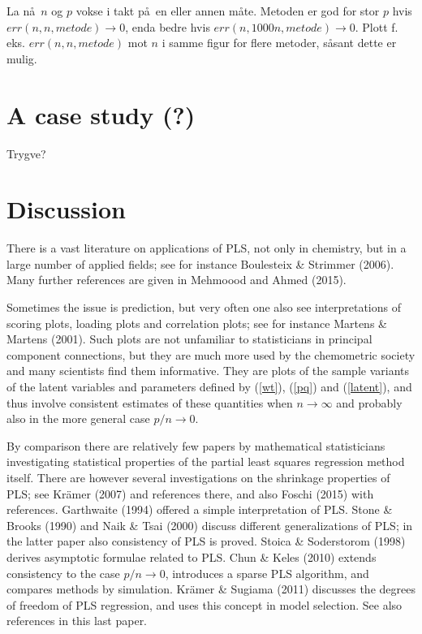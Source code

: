 \documentclass[11pt]{article}
\begin{document}
La n\aa\ $n$ og $p$ vokse i takt p\aa\ en eller annen m\aa te. Metoden er god for stor $p$ hvis $err(n,n,metode)\rightarrow 0$, enda bedre hvis $err(n, 1000n, metode)\rightarrow 0$. Plott f. eks.  $err(n,n, metode)$ mot $n$ i samme figur for flere metoder, s\aa sant dette er mulig.

\section{A case study (?)}

Trygve?

\section{Discussion}

There is a vast literature on applications of PLS, not only in chemistry, but in a large number of applied fields; see for instance Boulesteix \& Strimmer (2006). Many further references are given in Mehmoood and Ahmed (2015).

Sometimes the issue is prediction, but very often one also see interpretations of scoring plots, loading plots and correlation plots; see for instance Martens \& Martens (2001). Such plots are not unfamiliar to statisticians in principal component connections, but they are much more used by the chemometric society and many scientists find them informative. They are plots of the sample variants of the latent variables and parameters defined by (\ref{wt}), (\ref{pq}) and (\ref{latent}), and thus involve consistent estimates of these quantities when $n\rightarrow\infty$ and probably also in the more general case $p/n\rightarrow 0$.

By comparison there are relatively few papers by mathematical statisticians investigating statistical properties of the partial least squares regression method itself. There are however several investigations on the shrinkage properties of PLS; see Kr\"{a}mer (2007) and references there, and also Foschi (2015) with references. Garthwaite (1994) offered a simple interpretation of PLS. Stone \& Brooks (1990) and Naik \& Tsai (2000)  discuss different generalizations of PLS; in the latter paper also consistency of PLS is proved. Stoica \& Soderstorom (1998) derives asymptotic formulae related to PLS. Chun \& Keles (2010) extends consistency to the case $p/n\rightarrow 0$, introduces a sparse PLS algorithm, and compares methods by simulation.  Kr\"{a}mer \& Sugiama (2011) discusses the degrees of freedom of PLS regression, and uses this concept in model selection. See also references in this last paper.
\end{document}
